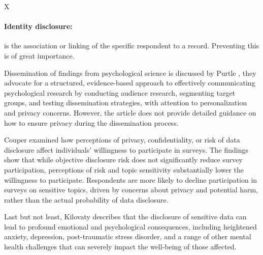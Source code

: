 \documentclass{article}
\begin{document}
X



\paragraph{Identity disclosure:} is the association or linking of the specific respondent to a record. Preventing this is of great importance. 










Dissemination of findings from psychological science is discussed by Purtle \cite{2020_Purtle}, they advocate for a structured, evidence-based approach to effectively communicating psychological research by conducting audience research, segmenting target groups, and testing dissemination strategies, with attention to personalization and privacy concerns. However, the article does not provide detailed guidance on how to ensure privacy during the dissemination process.

Couper \cite{2008_Couper} examined how perceptions of privacy, confidentiality, or risk of data disclosure affect individuals' willingness to participate in surveys. The findings show that while objective disclosure risk does not significantly reduce survey participation, perceptions of risk and topic sensitivity substantially lower the willingness to participate. Respondents are more likely to decline participation in surveys on sensitive topics, driven by concerns about privacy and potential harm, rather than the actual probability of data disclosure.

Last but not least, Kilovaty \cite{2021_Kilovaty} describes that the disclosure of sensitive data can lead to profound emotional and psychological consequences, including heightened anxiety, depression, post-traumatic stress disorder, and a range of other mental health challenges that can severely impact the well-being of those affected.
\end{document}
